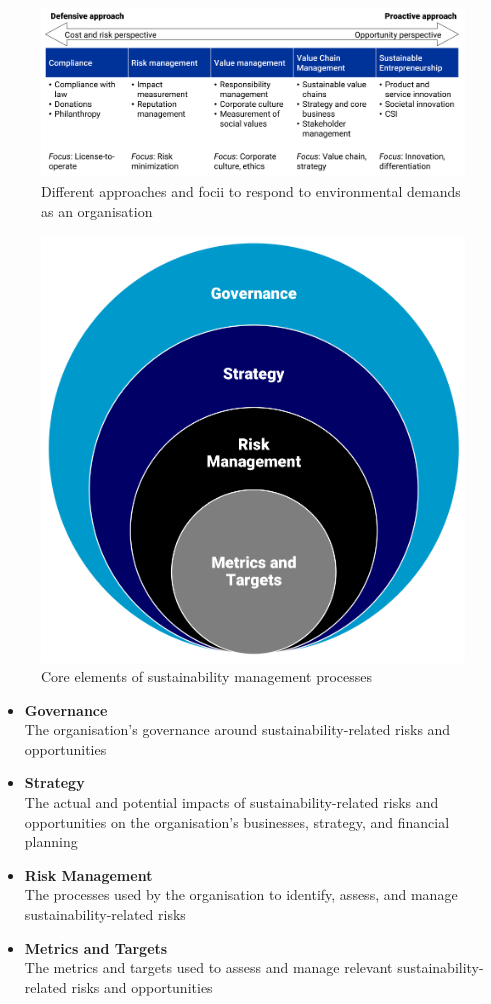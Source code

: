\documentclass[11pt]{article}
\theoremstyle{definition}
\begin{document}
\begin{figure}[H]
	\centering
	\includegraphics[width=0.9\linewidth]{img/organisational_approaches_environmental_demands}
	\caption{Different approaches and focii to respond to environmental demands as an organisation}
	\label{fig:organisationalapproachesenvironmentaldemands}
\end{figure}

\begin{figure}[H]
	\centering
	\includegraphics[width=0.4\linewidth]{img/core_elements_sustainability_management}
	\caption{Core elements of sustainability management processes}
	\label{fig:coreelementssustainabilitymanagement}
\end{figure}

\begin{itemize}[label=, left=0pt]
	\item \textbf{Governance}\\
	The organisation's governance around sustainability-related risks and opportunities
	\item \textbf{Strategy}\\
	The actual and potential impacts of sustainability-related risks and opportunities on the organisation's businesses, strategy, and financial planning
	\item \textbf{Risk Management}\\
	The processes used by the organisation to identify, assess, and manage sustainability-related risks
	\item \textbf{Metrics and Targets}\\
	The metrics and targets used to assess and manage relevant sustainability-related risks and opportunities
\end{itemize}
\end{document}
